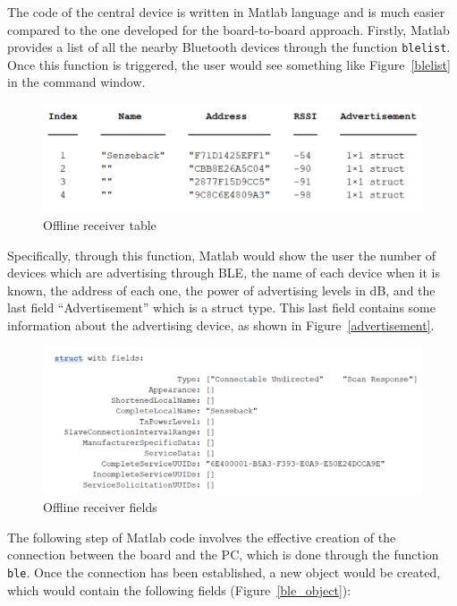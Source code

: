 \documentclass{Configuration_Files/PoliMi3i_thesis}
\begin{document}
The code of the central device is written in Matlab language and is much easier compared to the one developed for the board-to-board approach. Firstly, Matlab provides a list of all the nearby Bluetooth devices through the function \texttt{blelist}. Once this function is triggered, the user would see something like Figure~\ref{blelist} in the command window.

\begin{figure}[H]
    \centering
    \includegraphics[scale=0.6]{Board Windows PC/2.png}
    \caption{Offline receiver table}
    \label{boardwindows_2}
\end{figure}

Specifically, through this function, Matlab would show the user the number of devices which are advertising through BLE, the name of each device when it is known, the address of each one, the power of advertising levels in dB, and the last field “Advertisement” which is a struct type. This last field contains some information about the advertising device, as shown in Figure~\ref{advertisement}.

\begin{figure}[H]
    \centering
    \includegraphics[scale=0.6]{Board Windows PC/3.png}
    \caption{Offline receiver fields}
    \label{boardwindows_3}
\end{figure}

The following step of Matlab code involves the effective creation of the connection between the board and the PC, which is done through the function \texttt{ble}. Once the connection has been established, a new object would be created, which would contain the following fields (Figure~\ref{ble_object}):
\end{document}

